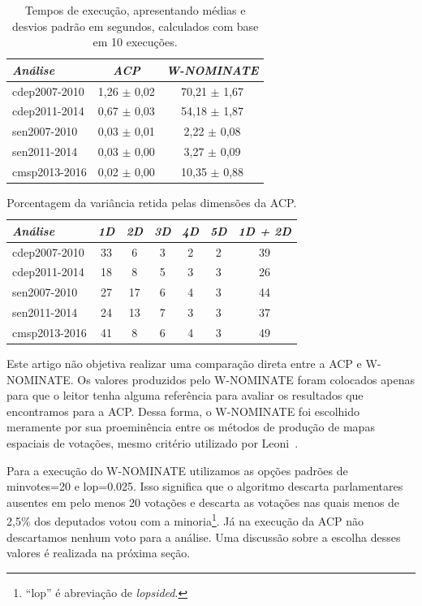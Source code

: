 \documentclass[a4paper, 12pt]{article}
\newcommand\wnominate{W-NOMINATE\xspace}
\begin{document}
\begin{table}
\centering
\begin{tabular}{l c c}
\itshape Análise & \itshape ACP & \itshape \wnominate \\
\hline
cdep2007-2010 & 1,26 $\pm$ 0,02 & 70,21 $\pm$ 1,67 \\ 
cdep2011-2014 & 0,67 $\pm$ 0,03 & 54,18 $\pm$ 1,87 \\ 
sen2007-2010  & 0,03 $\pm$ 0,01 & 2,22 $\pm$ 0,08  \\ 
sen2011-2014  & 0,03 $\pm$ 0,00 & 3,27 $\pm$ 0,09  \\ 
cmsp2013-2016 & 0,02 $\pm$ 0,00 & 10,35 $\pm$ 0,88  \\ 
\end{tabular} 
\caption{Tempos de execução, apresentando médias e desvios padrão em segundos, calculados com base em 10 execuções.}
\label{tab:tempos}
\end{table}


\begin{table}
\centering
\begin{tabular}{l c c c c c | c}
\itshape Análise & \itshape 1D & \itshape 2D & \itshape 3D & \itshape 4D & \itshape 5D & \itshape 1D + 2D \\
\hline
cdep2007-2010 & 33 &  6 & 3 & 2 & 2 & 39  \\ 
cdep2011-2014 & 18 &  8 & 5 & 3 & 3 & 26  \\ 
sen2007-2010  & 27 & 17 & 6 & 4 & 3 & 44  \\ 
sen2011-2014  & 24 & 13 & 7 & 3 & 3 & 37  \\ 
cmsp2013-2016 & 41 &  8 & 6 & 4 & 3 & 49  \\ 
\end{tabular} 
\caption{Porcentagem da variância retida pelas dimensões da ACP.}
\label{tab:variacao-explicada-acp}
\end{table}

Este artigo não objetiva realizar uma comparação direta entre a ACP e \wnominate. Os valores produzidos pelo \wnominate foram colocados apenas para que o leitor tenha alguma referência para avaliar os resultados que encontramos para a ACP. Dessa forma, o \wnominate foi escolhido meramente por sua proeminência entre os métodos de produção de mapas espaciais de votações, mesmo critério utilizado por Leoni~\cite{leoni02cdep}.

Para a execução do \wnominate utilizamos as opções padrões de \textsf{minvotes=20} e \textsf{lop=0.025}. Isso significa que o algoritmo descarta parlamentares ausentes em pelo menos 20 votações e descarta as votações nas quais menos de 2,5\% dos deputados votou com a minoria\footnote{``lop'' é abreviação de \emph{lopsided}.}. Já na execução da ACP não descartamos nenhum voto para a análise. Uma discussão sobre a escolha desses valores é realizada na próxima seção.
\end{document}
